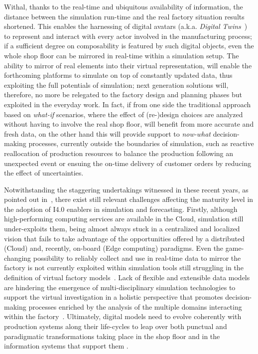 Withal, thanks to the real-time and ubiquitous availability of information, the distance between the simulation run-time and the real factory situation results shortened. 
This enables the harnessing of digital avatars (a.k.a. \textit{Digital Twins}~\cite{Uhlemann2017}) to represent and interact with every actor involved in the manufacturing process; if a sufficient degree on composability is featured by such digital objects, even the whole shop floor can be mirrored in real-time within a simulation setup.   
The ability to mirror of real elements into their virtual representation, will enable the forthcoming platforms to simulate on top of constantly updated data, thus exploiting the full potentials of simulation; next generation solutions will, therefore, no more be relegated to the factory design and planning phases but exploited in the everyday work. In fact, if from one side the traditional approach based on \textit{what-if} scenarios, where the effect of (re-)design choices are analyzed without having to involve the real shop floor, will benefit from more accurate and fresh data, on the other hand this will provide support to \textit{now-what} decision-making processes, currently outside the boundaries of simulation, such as reactive reallocation of production resources to balance the production following an unexpected event or ensuing the on-time delivery of customer orders by reducing the effect of uncertainties.


Notwithstanding the staggering undertakings witnessed in these recent years, as pointed out in~\cite{pedrazzoli2014simulation}, there exist still relevant challenges affecting the maturity level in the adoption of I4.0 enablers in simulation and forecasting. 
Firstly, although high-performing computing services are available in the Cloud, simulation still under-exploits them, being almost always stuck in a centralized and localized vision that fails to take advantage of the opportunities offered by a distributed (Cloud) and, recently, on-board (Edge computing) paradigms.
Even the game-changing possibility to reliably collect and use in real-time data to mirror the factory is not currently exploited within simulation tools still struggling in the definition of virtual factory models~\cite{ciavotta2017microservice}.
Lack of flexible and extensible data models are hindering the emergence of multi-disciplinary simulation technologies to support the virtual investigation in a holistic perspective that promotes decision-making processes enriched by the analysis of the multiple domains interacting within the factory~\cite{hehenberger2016design}.
Ultimately, digital models need to evolve coherently with production systems along their life-cycles to leap over both punctual and paradigmatic transformations taking place in the shop floor and in the  information systems that support them \cite{azab2012simulation}.

